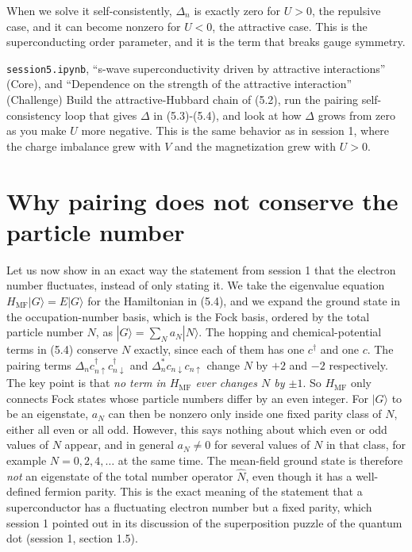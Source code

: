 When we solve it self-consistently, $\Delta_n$ is exactly zero for $U>0$, the repulsive case, and it
can become nonzero for $U<0$, the attractive case. This is the superconducting order parameter, and
it is the term that breaks gauge symmetry.

\begin{notebookbox}{\texttt{session5.ipynb}, ``s-wave superconductivity driven by attractive interactions'' (Core), and ``Dependence on the strength of the attractive interaction'' (Challenge)}
Build the attractive-Hubbard chain of (5.2), run the pairing self-consistency loop that gives
$\Delta$ in (5.3)-(5.4), and look at how $\Delta$ grows from zero as you make $U$ more negative.
This is the same behavior as in session 1, where the charge imbalance grew with $V$ and the
magnetization grew with $U>0$.
\end{notebookbox}

\section{Why pairing does not conserve the particle number}

Let us now show in an exact way the statement from session 1 that the electron number fluctuates,
instead of only stating it. We take the eigenvalue equation $H_{\text{MF}}|G\rangle = E|G\rangle$
for the Hamiltonian in (5.4), and we expand the ground state in the occupation-number basis, which
is the Fock basis, ordered by the total particle number $N$, as $|G\rangle = \sum_N a_N |N\rangle$.
The hopping and chemical-potential terms in (5.4) conserve $N$ exactly, since each of them has one
$c^\dagger$ and one $c$. The pairing terms $\Delta_n
c_{n\uparrow}^\dagger c_{n\downarrow}^\dagger$ and $\Delta_n^* c_{n\downarrow}c_{n\uparrow}$ change
$N$ by $+2$ and $-2$ respectively. The key point is that \emph{no term in $H_{\text{MF}}$ ever
changes $N$ by $\pm 1$}. So $H_{\text{MF}}$ only connects Fock states whose particle numbers differ
by an even integer. For $|G\rangle$ to be an eigenstate, $a_N$ can then be nonzero only inside one
fixed parity class of $N$, either all even or all odd. However, this says nothing about which even
or odd values of $N$ appear, and in general $a_N \ne 0$ for several values of $N$ in that class,
for example $N=0,2,4,\dots$ at the same time. The mean-field ground state is therefore \emph{not}
an eigenstate of the total number operator $\hat N$, even though it has a well-defined fermion
parity. This is the exact meaning of the statement that a superconductor has a fluctuating electron
number but a fixed parity, which session 1 pointed out in its discussion of the superposition
puzzle of the quantum dot (session 1, section 1.5).

